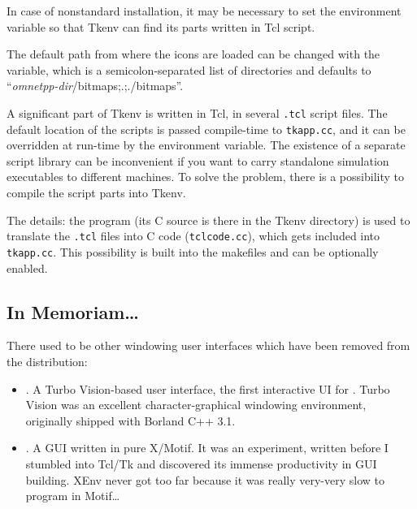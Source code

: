 

In case of nonstandard installation, it may be necessary to set the
 environment variable so that Tkenv can find
its parts written in Tcl script.

\begin{sloppypar}
The default path from where the icons are loaded can be changed with
the  variable, which is a
semicolon-separated list of directories and defaults to
``\textit{omnetpp-dir}/bitmaps;.;./bitmaps''.
\end{sloppypar}


A significant part of Tkenv is written in Tcl, in several
\texttt{.tcl} script files. The default location of the scripts is
passed compile-time to \texttt{tkapp.cc}, and it can be overridden at
run-time by the  environment variable. The
existence of a separate script library can be inconvenient if you want
to carry standalone simulation executables to different machines. To
solve the problem, there is a possibility to compile the script parts
into Tkenv.

The details: the  program (its C source is there in the
Tkenv directory) is used to translate the \texttt{.tcl} files into C
code (\texttt{tclcode.cc}), which gets included into
\texttt{tkapp.cc}. This possibility is built into the makefiles
and can be optionally enabled.

\subsection{In Memoriam\dots }

There used to be other windowing user interfaces which have been removed
from the distribution:

\begin{itemize}
  \item {}. A Turbo Vision-based user interface, the first
    interactive UI for {\opp}. Turbo Vision was an excellent
    character-graphical windowing environment, originally shipped with
    Borland C++ 3.1.
  \item {}. A GUI written in pure X/Motif. It was an
    experiment, written before I stumbled into Tcl/Tk and discovered
    its immense productivity in GUI building. XEnv never got too far
    because it was really very-very slow to program in Motif\dots
\end{itemize}


